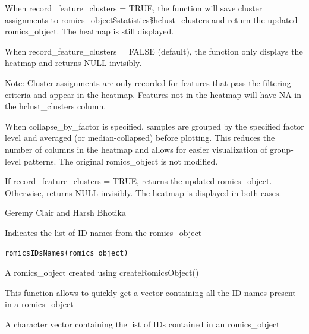 \documentclass[a4paper]{book}
\begin{document}
%
\begin{Details}
When record\_feature\_clusters = TRUE, the function will save cluster assignments to romics\_object\$statistics\$hclust\_clusters
and return the updated romics\_object. The heatmap is still displayed.

When record\_feature\_clusters = FALSE (default), the function only displays the heatmap and returns NULL invisibly.

Note: Cluster assignments are only recorded for features that pass the filtering criteria and appear in the heatmap.
Features not in the heatmap will have NA in the hclust\_clusters column.

When collapse\_by\_factor is specified, samples are grouped by the specified factor level and averaged
(or median-collapsed) before plotting. This reduces the number of columns in the heatmap and allows
for easier visualization of group-level patterns. The original romics\_object is not modified.
\end{Details}
%
\begin{Value}
If record\_feature\_clusters = TRUE, returns the updated romics\_object. Otherwise, returns NULL invisibly. The heatmap is displayed in both cases.
\end{Value}
%
\begin{Author}
Geremy Clair and Harsh Bhotika
\end{Author}
%
\begin{Description}
Indicates the list of ID names from the romics\_object
\end{Description}
%
\begin{Usage}
\begin{verbatim}
romicsIDsNames(romics_object)
\end{verbatim}
\end{Usage}
%
\begin{Arguments}
\begin{ldescription}
\item[\code{romics\_object}] A romics\_object created using createRomicsObject()
\end{ldescription}
\end{Arguments}
%
\begin{Details}
This function allows to quickly get a vector containing all the ID names present in a romics\_object
\end{Details}
%
\begin{Value}
A character vector containing the list of IDs contained in an romics\_object
\end{Value}
\end{document}
